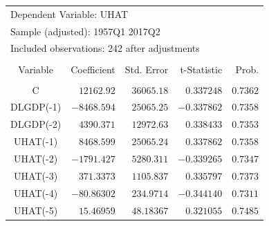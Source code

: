 \documentclass[12pt]{report}
\begin{document}
\vspace{-\baselineskip}
\begin{table}[H]
	\centering
	\begin{tabular}{lrrrr}
		\multicolumn{3}{l}{Dependent Variable: UHAT}&\multicolumn{1}{c}{}&\multicolumn{1}{c}{}\\
		\multicolumn{4}{l}{Sample (adjusted): 1957Q1 2017Q2}&\multicolumn{1}{c}{}\\
		\multicolumn{5}{l}{Included observations: 242 after adjustments}\\
		[4.5pt] \hline \\ [-4.5pt]
		\multicolumn{1}{c}{Variable}&\multicolumn{1}{r}{Coefficient}&\multicolumn{1}{r}{Std. Error}&\multicolumn{1}{r}{t-Statistic}&\multicolumn{1}{r}{Prob.}\\
		[4.5pt] \hline \\ [-4.5pt]
		\multicolumn{1}{c}{C}&\multicolumn{1}{r}{$12162.92$}&\multicolumn{1}{r}{$36065.18$}&\multicolumn{1}{r}{$0.337248$}&\multicolumn{1}{r}{$0.7362$}\\
		\multicolumn{1}{c}{DLGDP(-1)}&\multicolumn{1}{r}{$-8468.594$}&\multicolumn{1}{r}{$25065.25$}&\multicolumn{1}{r}{$-0.337862$}&\multicolumn{1}{r}{$0.7358$}\\
		\multicolumn{1}{c}{DLGDP(-2)}&\multicolumn{1}{r}{$4390.371$}&\multicolumn{1}{r}{$12972.63$}&\multicolumn{1}{r}{$0.338433$}&\multicolumn{1}{r}{$0.7353$}\\
		\multicolumn{1}{c}{UHAT(-1)}&\multicolumn{1}{r}{$8468.599$}&\multicolumn{1}{r}{$25065.24$}&\multicolumn{1}{r}{$0.337862$}&\multicolumn{1}{r}{$0.7358$}\\
		\multicolumn{1}{c}{UHAT(-2)}&\multicolumn{1}{r}{$-1791.427$}&\multicolumn{1}{r}{$5280.311$}&\multicolumn{1}{r}{$-0.339265$}&\multicolumn{1}{r}{$0.7347$}\\
		\multicolumn{1}{c}{UHAT(-3)}&\multicolumn{1}{r}{$371.3373$}&\multicolumn{1}{r}{$1105.837$}&\multicolumn{1}{r}{$0.335797$}&\multicolumn{1}{r}{$0.7373$}\\
		\multicolumn{1}{c}{UHAT(-4)}&\multicolumn{1}{r}{$-80.86302$}&\multicolumn{1}{r}{$234.9714$}&\multicolumn{1}{r}{$-0.344140$}&\multicolumn{1}{r}{$0.7311$}\\
		\multicolumn{1}{c}{UHAT(-5)}&\multicolumn{1}{r}{$15.46959$}&\multicolumn{1}{r}{$48.18367$}&\multicolumn{1}{r}{$0.321055$}&\multicolumn{1}{r}{$0.7485$}\\

\end{tabular}
\end{table}
\end{document}
